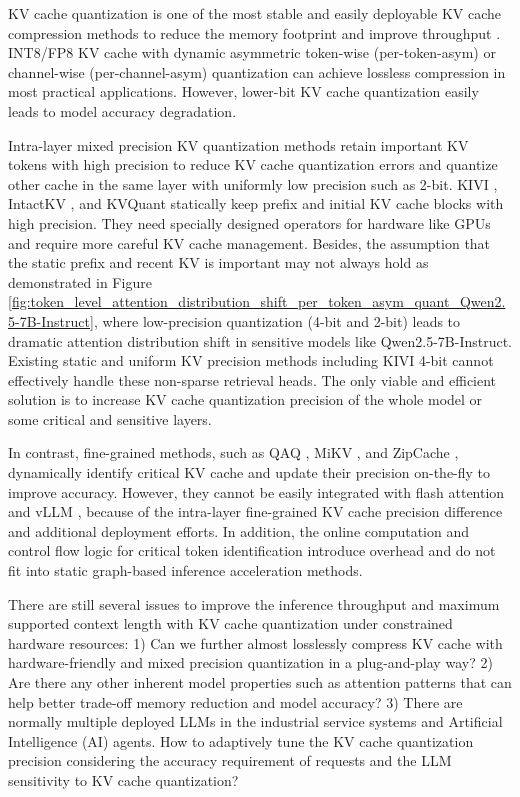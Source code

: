 KV cache quantization is one of the most stable and easily deployable KV cache compression methods to reduce the memory footprint and improve throughput \cite{yuan2024kvcompression}. INT8/FP8 KV cache with dynamic asymmetric token-wise (per-token-asym) or channel-wise (per-channel-asym) quantization can achieve lossless compression in most practical applications. However, lower-bit KV cache quantization easily leads to model accuracy degradation. 

Intra-layer mixed precision KV quantization methods retain important KV tokens with high precision to reduce KV cache quantization errors and quantize other cache in the same layer with uniformly low precision such as 2-bit. KIVI \cite{liu2024kivi}, IntactKV \cite{liu2024intactkv}, and KVQuant \cite{hooper2024kvquant} statically keep prefix and initial KV cache blocks with high precision. 
They need specially designed operators for hardware like GPUs and require more careful KV cache management. Besides, the assumption that the static prefix and recent KV is important may not always hold as demonstrated in Figure \ref{fig:token_level_attention_distribution_shift_per_token_asym_quant_Qwen2.5-7B-Instruct}, where low-precision quantization (4-bit and 2-bit) leads to dramatic attention distribution shift in sensitive models like Qwen2.5-7B-Instruct. Existing static and uniform KV precision methods including KIVI 4-bit cannot effectively handle these non-sparse retrieval heads. The only viable and efficient solution is to increase KV cache quantization precision of the whole model or some critical and sensitive layers.

In contrast, fine-grained methods, such as QAQ \cite{dong2024qaq}, MiKV \cite{yang2024mikv}, and ZipCache \cite{he2024zipcache}, dynamically identify critical KV cache and update their precision on-the-fly to improve accuracy. 
However, they cannot be easily integrated with flash attention \cite{dao2022flashattention} and vLLM \cite{kwon2023vllm}, because of the intra-layer fine-grained KV cache precision difference and additional deployment efforts. In addition, the online computation and control flow logic for critical token identification introduce overhead and do not fit into static graph-based inference acceleration methods.%
  

There are still several issues to improve the inference throughput and maximum supported context length with KV cache quantization under constrained hardware resources: 
1) 
Can we further almost losslessly compress KV cache with hardware-friendly and mixed precision quantization in a plug-and-play way?
2) Are there any other inherent model properties such as attention patterns \cite{tang2024razorattention, xiao2024duoattention} that can help better trade-off memory reduction and model accuracy?
3) There are normally multiple deployed LLMs in the industrial service systems and Artificial Intelligence (AI) agents. How to adaptively tune the KV cache quantization precision considering the accuracy requirement of requests and the LLM sensitivity to KV cache quantization?

